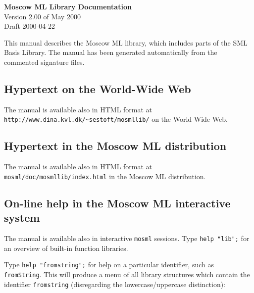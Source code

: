 \documentclass[fleqn,twoside]{article}
\begin{document}
\begin{center}

  \vspace*{0cm}

{\huge\bf Moscow ML Library Documentation}\\[0.5cm]

{Version 2.00 of May 2000\\ Draft 2000-04-22}\\[1cm]

\end{center}

\vspace{1cm}

\noindent 
This manual describes the Moscow ML library, which includes parts of
the SML Basis Library\@.  The manual has been generated automatically
from the commented signature files.



\subsection*{Hypertext on the World-Wide Web}

The manual is available also in HTML format at
\verb$http://www.dina.kvl.dk/~sestoft/mosmllib/$ on the World Wide
Web.


\subsection*{Hypertext in the Moscow ML distribution}

The manual is available also in HTML format at
\verb$mosml/doc/mosmllib/index.html$ in the Moscow ML distribution.


\subsection*{On-line help in the Moscow ML interactive system}

The manual is available also in interactive {\tt mosml} sessions.
Type {\tt help "lib";} for an overview of built-in function libraries.

Type {\tt help "fromstring";} for help on a particular identifier,
such as {\tt fromString}.  This will produce a menu of all library
structures which contain the identifier {\tt fromstring} (disregarding
the lowercase/uppercase distinction):
\end{document}
